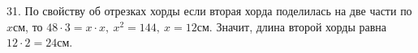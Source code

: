 31. По свойству об отрезках хорды если вторая хорда поделилась на две части по $x$см, то $48\cdot3=x\cdot x,\ x^2=144,\ x=12$см. Значит, длина второй хорды равна $12\cdot2=24$см.\\
